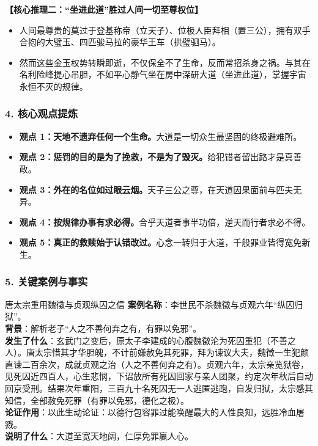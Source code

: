 \noindent\textbf{【核心推理二：“坐进此道”胜过人间一切至尊权位】}
\begin{itemize}
    \item 人间最尊贵的莫过于登基称帝（立天子）、位极人臣拜相（置三公），拥有双手合抱的大璧玉、四匹骏马拉的豪华王车（拱璧驷马）。
    \item 然而这些金玉权势转瞬即逝，不仅保全不了生命，反而常招杀身之祸。与其在名利险峰提心吊胆，不如平心静气坐在房中深研大道（坐进此道），掌握宇宙永恒不灭的规律。
\end{itemize}

\subsubsection{4. 核心观点提炼}
\begin{itemize}
    \item \textbf{观点 1：天地不遗弃任何一个生命。}大道是一切众生最坚固的终极避难所。
    \item \textbf{观点 2：惩罚的目的是为了挽救，不是为了毁灭。}给犯错者留出路才是真善政。
    \item \textbf{观点 3：外在的名位如过眼云烟。}天子三公之尊，在天道因果面前与匹夫无异。
    \item \textbf{观点 4：按规律办事有求必得。}合乎天道者事半功倍，逆天而行者求必不得。
    \item \textbf{观点 5：真正的救赎始于认错改过。}心念一转归于大道，千般罪业皆得宽免新生。
\end{itemize}

\subsubsection{5. 关键案例与事实}
\begin{CaseBox}{唐太宗重用魏徵与贞观纵囚之信}
\textbf{案例名称}：李世民不杀魏徵与贞观六年“纵囚归狱”。\\
\textbf{背景}：解析老子“人之不善何弃之有，有罪以免邪”。\\
\textbf{发生了什么}：玄武门之变后，原太子李建成的心腹魏徵沦为死囚重犯（不善之人）。唐太宗惜其才华胆魄，不计前嫌赦免其死罪，拜为谏议大夫，魏徵一生犯颜直谏二百余次，成就贞观之治（人之不善何弃之有）。贞观六年，太宗亲览狱卷，见死囚近四百人，心生悲悯，下诏放所有死囚回家与亲人团聚，约定次年秋后自动回京受刑。结果次年重阳，三百九十名死囚无一人逃匿逃跑，自发归狱，太宗感其知信，全部赦免死罪（有罪以免邪，德化之极）。\\
\textbf{论证作用}：以此生动论证：以德行包容罪过能唤醒最大的人性良知，远胜冷血屠戮。\\
\textbf{说明了什么}：大道至宽天地阔，仁厚免罪赢人心。
\end{CaseBox}

